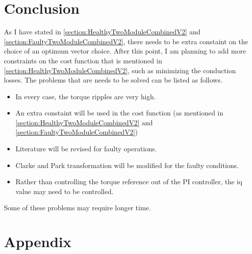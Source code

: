 \documentclass{article}
\begin{document}
\section{Conclusion}
As I have stated in \ref{section:HealthyTwoModuleCombinedV2} and \ref{section:FaultyTwoModuleCombinedV2}, there needs to be extra constaint on the choice of an optimum vector choice. After this point, I am planning to add more constraints on the cost function that is mentioned in \ref{section:HealthyTwoModuleCombinedV2}, such as minimizing the conduction losses. The problems that are needs to be solved can be listed as follows.

\begin{itemize}
    \item In every case, the torque ripples are very high.
    \item An extra constaint will be used in the cost function (as mentioned in \ref{section:HealthyTwoModuleCombinedV2} and \ref{section:FaultyTwoModuleCombinedV2})
    \item Literature will be revised for faulty operations.
    \item Clarke and Park transformation will be modified for the faulty conditions.
    \item Rather than controlling the torque reference out of the PI controller, the iq value may need to be controlled.
\end{itemize}

Some of these problems may require longer time. 

\section{Appendix}









\end{document}
